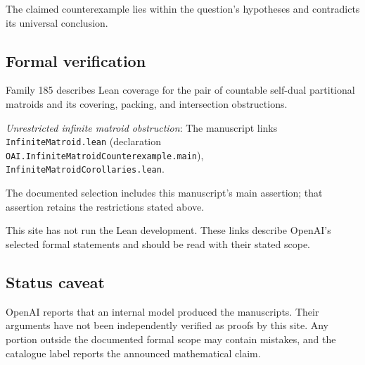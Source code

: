 \documentclass[11pt]{article}
\begin{document}
The claimed counterexample lies within the question’s hypotheses and contradicts its universal conclusion.

\subsection{Formal verification}
Family 185 describes Lean coverage for the pair of countable self-dual partitional matroids and its covering, packing, and intersection obstructions.

\textit{Unrestricted infinite matroid obstruction}: The manuscript links \texttt{InfiniteMatroid.lean} (declaration \texttt{OAI.InfiniteMatroidCounterexample.main}), \texttt{InfiniteMatroidCorollaries.lean}.

The documented selection includes this manuscript’s main assertion; that assertion retains the restrictions stated above.

This site has not run the Lean development. These links describe OpenAI’s selected formal statements and should be read with their stated scope.

\subsection{Status caveat}
OpenAI reports that an internal model produced the manuscripts. Their arguments have not been independently verified as proofs by this site. Any portion outside the documented formal scope may contain mistakes, and the catalogue label reports the announced mathematical claim.
\end{document}
